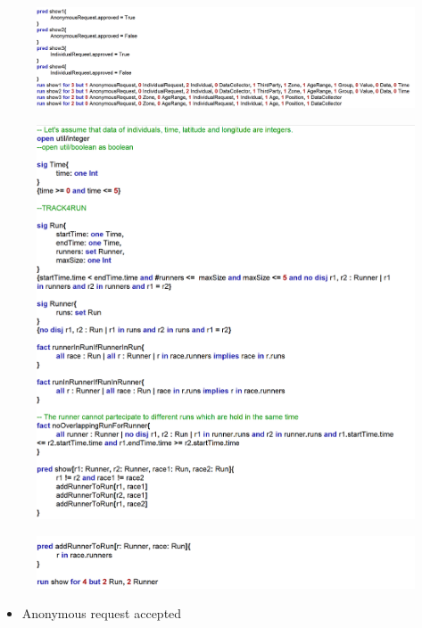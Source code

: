 \documentclass{article}
\begin{document}
\begin{legal}
\begin{figure}[H]
		\end{figure}
		\begin{figure}[H]
			\includegraphics[width=\linewidth]{./images/alloy/code/data4Help_5.PNG}
		\end{figure}
		\newpage
		\begin{figure}[H]
			\includegraphics[width=\linewidth]{./images/alloy/code/track4Run_1.PNG}
		\end{figure}
		\begin{figure}[H]
			\includegraphics[width=\linewidth]{./images/alloy/code/track4Run_2.PNG}
		\end{figure}		
		\begin{itemize}
			\newpage
			\item Anonymous request accepted

\end{itemize}
\end{legal}
\end{document}
